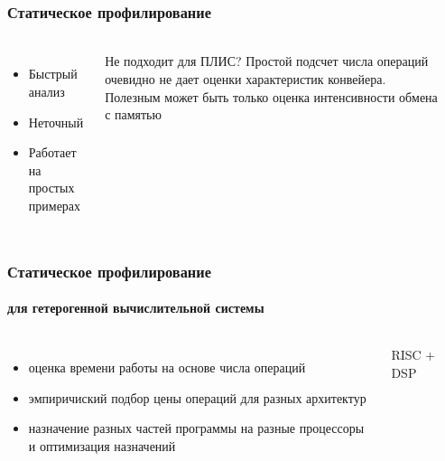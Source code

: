\documentclass{beamer}              %
\begin{document}
\begin{frame}[fragile]
\frametitle{Статическое профилирование}
  \framesubtitle{}
  \begin{columns}
        \begin{itemize}
            \item Быстрый анализ 
            \item Неточный
            \item Работает на простых примерах
        \end{itemize}      

    \begin{block}{Не подходит для ПЛИС?}
         Простой подсчет числа операций очевидно не дает оценки характеристик конвейера.
         Полезным может быть только оценка интенсивности обмена с памятью
      \end{block}
    \label{encode_listing}
      
\end{columns}
  
\end{frame}

\begin{frame}[fragile]
\frametitle{Статическое профилирование}
  \framesubtitle{для гетерогенной вычислительной системы}
  \begin{columns}
        \begin{itemize}
             \item оценка времени работы на основе числа операций
             \item эмпиричиский подбор цены операций для разных архитектур 
             \item назначение разных частей программы на разные процессоры и оптимизация назначений
        \end{itemize}      

    \begin{block}{RISC + DSP}
         
      \end{block}
    \label{encode_listing}
      
\end{columns}
  
\end{frame}
\end{document}
